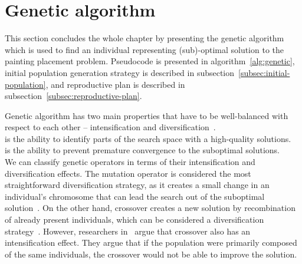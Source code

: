 \clearpage%
\newpage


\section{Genetic algorithm}\label{sec:genetic-algorithm}
This section concludes the whole chapter by presenting the genetic algorithm
which is used to find an individual representing (sub)-optimal solution to the painting placement problem.
Pseudocode is presented in algorithm~\ref{alg:genetic}, initial population generation strategy is described in
subsection~\ref{subsec:initial-population}, and reproductive plan is described in subsection~\ref{subsec:reproductive-plan}.

Genetic algorithm has two main properties that have to be well-balanced with respect to each other
– intensification and diversification~\cite{blumMetaheuristicsCombinatorialOptimization2003}.\\

 is the ability to identify parts of the search space with a high-quality
solutions.\\

 is the ability to prevent premature convergence to the suboptimal solutions.\\

We can classify genetic operators in terms of their intensification and diversification effects.
The mutation operator is considered the most straightforward diversification strategy,
as it creates a small change in an individual's chromosome that can lead the search out of the suboptimal solution~\cite{blumMetaheuristicsCombinatorialOptimization2003}.
On the other hand, crossover creates a new solution by recombination of already present
individuals, which can be considered a diversification strategy~\cite{blumMetaheuristicsCombinatorialOptimization2003}.
However, researchers in~\cite{hanshengBalanceExplorationExploitation1999} argue that crossover
also has an intensification effect.
They argue that if the population were primarily composed of the same individuals, the crossover would not be able to improve the solution.
\\

